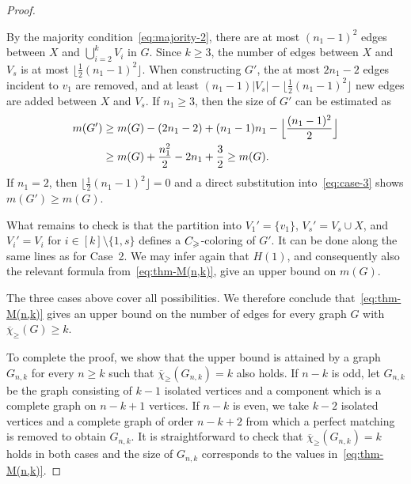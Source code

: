 \documentclass[10pt,a4paper]{amsart}
\newcommand{\cg}{{\rm C}_{\geqslant}}
\newcommand{\mc}{\overline{\chi}_{\geqslant}}
\begin{document}
\begin{proof}
\begin{description}
       By the majority condition~\eqref{eq:majority-2}, there are at most $(n_1-1)^2$ edges between $X$ and $\bigcup_{i=2}^k V_i$ in $G$. Since $k \ge 3$, the number of edges between $X$ and $V_s$ is at most $\lfloor \frac{1}{2} (n_1-1)^2 \rfloor$. When constructing $G'$, the at most $2n_1-2$ edges incident to $v_1$ are removed, and at least
       $(n_1-1)|V_s|- \lfloor \frac{1}{2} (n_1-1)^2 \rfloor$ new edges are added between $X$ and $V_s$. If $n_1 \ge 3$, then the size of $G'$ can be estimated as 
       \begin{align} \label{eq:case-3}
                m(G') &\ge m(G) -(2n_1-2) + (n_1-1)n_1 - \Bigl\lfloor \frac{(n_1-1)^2}{2} \Bigr\rfloor\\
        \nonumber  &\ge m(G) + \frac{n_1^2}{2}-2n_1+\frac{3}{2} \ge m(G).
       \end{align} 
       If $n_1=2$, then $\lfloor \frac{1}{2} (n_1-1)^2 \rfloor=0$ and a direct substitution into~\eqref{eq:case-3} shows $m(G') \ge m(G)$. 

       What remains to check is that the partition into $V_1'=\{v_1\}$, $V_s'= V_s \cup X$, and $V_i'=V_i$ for $i \in [k] \setminus \{1,s\}$ defines a $\cg$-coloring of $G'$. It can be done along the same lines as for Case~2.
       We may infer again that $H(1)$, and consequently also the relevant formula from~\eqref{eq:thm-M(n,k)}, give an upper bound on $m(G)$.
   \end{description}
   The three cases above cover all possibilities. We therefore conclude that~\eqref{eq:thm-M(n,k)} gives an upper bound on the number of edges for every graph $G$ with  $\mc(G) \ge k$. 
   \medskip
   
   To complete the proof, we show that the upper bound is attained by a graph $G_{n,k}$ for every $n \ge k$ such that $\mc(G_{n,k})=k$ also holds. If $n-k$ is odd, let $G_{n,k}$ be the graph consisting of $k-1$ isolated vertices and a component which is a complete graph on $n-k+1$ vertices.  If $n-k$ is even, we take $k-2$ isolated vertices and a complete graph of order $n-k+2$ from which a perfect matching is removed to obtain $G_{n,k}$. It is straightforward to check that $\mc(G_{n,k})=k$ holds in both cases and the size of  $G_{n,k}$ corresponds to the values in~\eqref{eq:thm-M(n,k)}. 
   \end{proof}
\end{document}
